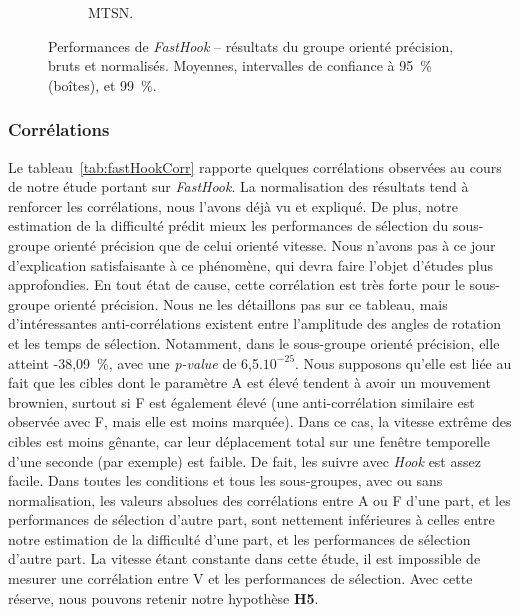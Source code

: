 \begin{figure}[htbp]
\begin{subfigure}[t]{0.49\textwidth}
			\caption{MTSN.}
			\label{fig:phPrNormTimes}
		\end{subfigure}
		\caption[\emph{FastHook} -- résultats III]{Performances de \emph{FastHook} -- résultats du groupe orienté précision, bruts et normalisés. Moyennes, intervalles de confiance à 95~\%{} (boîtes), et 99~\%{}.}
		\label{fig:fastHookPrRes}
	\end{figure}
	

	\subsubsection{Corrélations}
	Le tableau~\ref{tab:fastHookCorr} rapporte quelques corrélations observées au cours de notre étude portant sur \emph{FastHook}. La normalisation des résultats tend à renforcer les corrélations, nous l'avons déjà vu et expliqué. De plus, notre estimation de la difficulté prédit mieux les performances de sélection du sous-groupe orienté précision que de celui orienté vitesse. Nous n'avons pas à ce jour d'explication satisfaisante à ce phénomène, qui devra faire l'objet d'études plus approfondies. En tout état de cause, cette corrélation est très forte pour le sous-groupe orienté précision. Nous ne les détaillons pas sur ce tableau, mais d'intéressantes anti-corrélations existent entre l'amplitude des angles de rotation et les temps de sélection. Notamment, dans le sous-groupe orienté précision, elle atteint -38,09~\%{}, avec une \emph{p-value} de 6,5$.10^{-25}$. Nous supposons qu'elle est liée au fait que les cibles dont le paramètre A est élevé tendent à avoir un mouvement brownien, surtout si F est également élevé (une anti-corrélation similaire est observée avec F, mais elle est moins marquée). Dans ce cas, la vitesse extrême des cibles est moins gênante, car leur déplacement total sur une fenêtre temporelle d'une seconde (par exemple) est faible. De fait, les \og suivre \fg{} avec \emph{Hook} est assez facile. Dans toutes les conditions et tous les sous-groupes, avec ou sans normalisation, les valeurs absolues des corrélations entre A ou F d'une part, et les performances de sélection d'autre part, sont nettement inférieures à celles entre notre estimation de la difficulté d'une part, et les performances de sélection d'autre part. La vitesse étant constante dans cette étude, il est impossible de mesurer une corrélation entre V et les performances de sélection. Avec cette réserve, nous pouvons retenir notre hypothèse \textbf{H5}.
	
